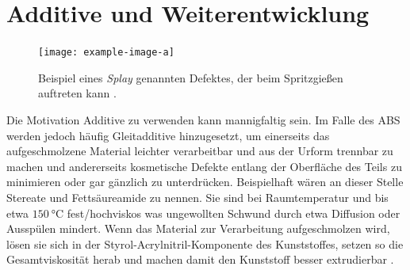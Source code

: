     \section{Additive und Weiterentwicklung}
        \begin{figure}%
            \centering
            \vspace{-\baselineskip}
            \texttt{[image: example-image-a]}
            \caption[Beispiel eines Defektes beim Spritzgießen]{Beispiel eines \textit{Splay} genannten Defektes, der beim Spritzgießen auftreten kann \cite{defects.of.casting.plastic.products.2018}.}%
            \label{fig:splay}%
        \end{figure}
        Die Motivation Additive zu verwenden kann mannigfaltig sein. Im Falle des ABS werden jedoch häufig Gleitadditive
        hinzugesetzt, um einerseits das aufgeschmolzene Material leichter verarbeitbar und aus der Urform trennbar zu machen
        und andererseits kosmetische Defekte entlang der Oberfläche des Teils zu minimieren oder gar gänzlich zu unterdrücken.
        Beispielhaft wären an dieser Stelle Stereate und Fettsäureamide zu nennen. Sie sind bei Raumtemperatur und bis etwa \(\SI{150}{\celsius}\)
        fest/hochviskos was ungewollten Schwund durch etwa Diffusion oder Ausspülen mindert. Wenn das Material zur Verarbeitung
        aufgeschmolzen wird, lösen sie sich in der Styrol-Acrylnitril-Komponente des Kunststoffes, setzen so die Gesamtviskosität
        herab und machen damit den Kunststoff besser extrudierbar \cite{influence.of.additives.on.flow.behavior.Blyler.1974,effects.on.ABS.by.Additives.for.3Dprinting.Torrado.2015}.\par\medskip
